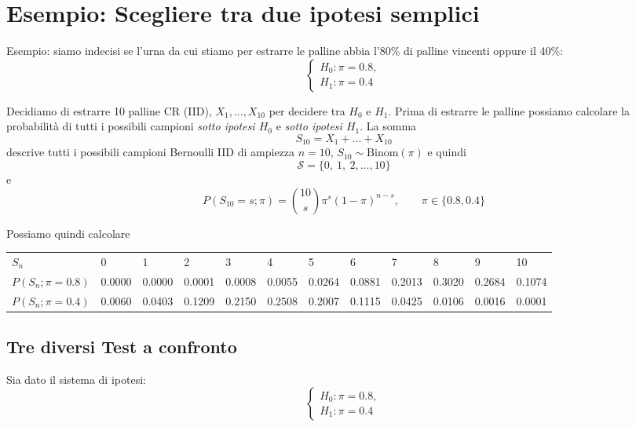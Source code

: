 \documentclass[
  11pt,
]{book}
\theoremstyle{mytheoremstyle}
\theoremstyle{mydefstyle}
\begin{document}
\section{Esempio: Scegliere tra due ipotesi semplici}\label{esempio-scegliere-tra-due-ipotesi-semplici}

Esempio: siamo indecisi se l'urna da cui stiamo per estrarre le palline abbia l'80\% di palline vincenti oppure il 40\%:
\[\begin{cases}
H_0:\pi=0.8, \\
H_1:\pi=0.4
\end{cases}
\]

Decidiamo di estrarre 10 palline CR (IID), \(X_1,...,X_{10}\) per decidere tra \(H_0\) e \(H_1\).
Prima di estrarre le palline possiamo calcolare la probabilità di tutti i possibili campioni \emph{sotto ipotesi \(H_0\)} e \emph{sotto ipotesi \(H_1\)}. La somma
\[S_{10}=X_1+...+X_{10}\]
descrive tutti i possibili campioni Bernoulli IID di ampiezza \(n=10\), \(S_{10}\sim\text{Binom}(\pi)\) e quindi
\[\mathcal{S}=\{0,~1,~2,...,10\}\]
e
\[P(S_{10}=s;\pi)=\binom{10}{s}\pi^s(1-\pi)^{n-s},\qquad \pi\in\{0.8,0.4\}\]

Possiamo quindi calcolare

\scriptsize
\begin{table}
\centering\begingroup\fontsize{10}{12}\selectfont

\begin{tabular}{llllllllllll}
\toprule
$S_n$ & 0 & 1 & 2 & 3 & 4 & 5 & 6 & 7 & 8 & 9 & 10\\
$P(S_n;\pi=0.8)$ & 0.0000 & 0.0000 & 0.0001 & 0.0008 & 0.0055 & 0.0264 & 0.0881 & 0.2013 & 0.3020 & 0.2684 & 0.1074\\
$P(S_n;\pi=0.4)$ & 0.0060 & 0.0403 & 0.1209 & 0.2150 & 0.2508 & 0.2007 & 0.1115 & 0.0425 & 0.0106 & 0.0016 & 0.0001\\
\bottomrule
\end{tabular}
\endgroup{}
\end{table}
\normalsize

\subsection{Tre diversi Test a confronto}\label{tre-diversi-test-a-confronto}

Sia dato il sistema di ipotesi:
\[\begin{cases}
H_0:\pi=0.8, \\
H_1:\pi=0.4
\end{cases}
\]
\end{document}

